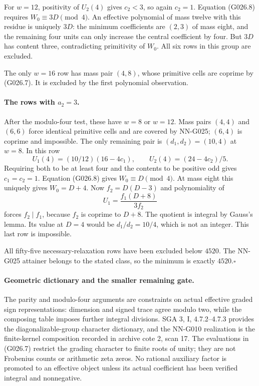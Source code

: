For $w=12$, positivity of $U_2(4)$ gives $c_2<3$,
so again $c_2=1$. Equation (G026.8) requires
$W_0\equiv3D\pmod4$. An effective polynomial of
mass twelve with this residue is uniquely $3D$:
the minimum coefficients are $(2,3)$ of mass eight,
and the remaining four units can only increase the
central coefficient by four. But $3D$ has content
three, contradicting primitivity of $W_0$. All six
rows in this group are excluded.

The only $w=16$ row has mass pair $(4,8)$, whose
primitive cells are coprime by (G026.7). It is
excluded by the first polynomial observation.

\paragraph{The rows with $a_2=3$.}
After the modulo-four test, these have $w=8$ or
$w=12$. Mass pairs $(4,4)$ and $(6,6)$ force identical
primitive cells and are covered by NN-G025; $(6,4)$
is coprime and impossible. The only remaining pair
is $(d_1,d_2)=(10,4)$ at $w=8$.
In this row
\[
 U_1(4)=(10/12)(16-4c_1),\qquad
 U_2(4)=(24-4c_2)/5.
\]
Requiring both to be at least four and the contents
to be positive odd gives $c_1=c_2=1$.
Equation (G026.8) gives $W_0\equiv D\pmod4$.
At mass eight this uniquely gives $W_0=D+4$.
Now $f_2=D(D-3)$ and polynomiality of
\[
 U_1=\frac{f_1(D+8)}{3f_2}
\]
forces $f_2\mid f_1$, because $f_2$ is coprime
to $D+8$. The quotient is integral by Gauss's lemma.
Its value at $D=4$ would be $d_1/d_2=10/4$, which
is not an integer. This last row is impossible.

All fifty-five necessary-relaxation rows have been
excluded below $4520$. The NN-G025 attainer belongs
to the stated class, so the minimum is exactly
$4520$.\hfill$\square$

\paragraph{Geometric dictionary and the smaller remaining gate.}
The parity and modulo-four arguments are constraints
on actual effective graded sign representations:
dimension and signed trace agree modulo two, while
the composing table imposes further integral divisions.
SGA 3, I, 4.7.2--4.7.3 provides the diagonalizable-group
character dictionary, and the NN-G010 realization is
the finite-kernel composition recorded in archive
cote 2, scan 17. The evaluations in (G026.7) restrict
the grading character to finite roots of unity;
they are not Frobenius counts or arithmetic zeta zeros.
No rational auxiliary factor is promoted to an
effective object unless its actual coefficient has
been verified integral and nonnegative.


